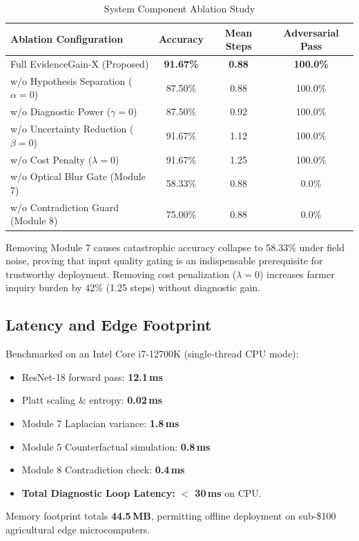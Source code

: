 \documentclass[conference]{IEEEtran}
\begin{document}
\begin{table}[h]
\caption{System Component Ablation Study}
\label{tab:ablation}
\centering
\begin{tabular}{lccc}
\toprule
\textbf{Ablation Configuration} & \textbf{Accuracy} & \textbf{Mean Steps} & \textbf{Adversarial Pass} \\
\midrule
Full EvidenceGain-X (Proposed) & \textbf{91.67\%} & \textbf{0.88} & \textbf{100.0\%} \\
w/o Hypothesis Separation ($\alpha = 0$) & 87.50\% & 0.88 & 100.0\% \\
w/o Diagnostic Power ($\gamma = 0$) & 87.50\% & 0.92 & 100.0\% \\
w/o Uncertainty Reduction ($\beta = 0$) & 91.67\% & 1.12 & 100.0\% \\
w/o Cost Penalty ($\lambda = 0$) & 91.67\% & 1.25 & 100.0\% \\
w/o Optical Blur Gate (Module 7) & 58.33\% & 0.88 & 0.0\% \\
w/o Contradiction Guard (Module 8) & 75.00\% & 0.88 & 0.0\% \\
\bottomrule
\end{tabular}
\end{table}

Removing Module 7 causes catastrophic accuracy collapse to 58.33\% under field noise, proving that input quality gating is an indispensable prerequisite for trustworthy deployment. Removing cost penalization ($\lambda = 0$) increases farmer inquiry burden by 42\% (1.25 steps) without diagnostic gain.

\subsection{Latency and Edge Footprint}
Benchmarked on an Intel Core i7-12700K (single-thread CPU mode):
\begin{itemize}
    \item ResNet-18 forward pass: \textbf{12.1\,ms}
    \item Platt scaling \& entropy: \textbf{0.02\,ms}
    \item Module 7 Laplacian variance: \textbf{1.8\,ms}
    \item Module 5 Counterfactual simulation: \textbf{0.8\,ms}
    \item Module 8 Contradiction check: \textbf{0.4\,ms}
    \item \textbf{Total Diagnostic Loop Latency:} \textbf{$<$ 30\,ms} on CPU.
\end{itemize}
Memory footprint totals \textbf{44.5\,MB}, permitting offline deployment on sub-\$100 agricultural edge microcomputers.
\end{document}
